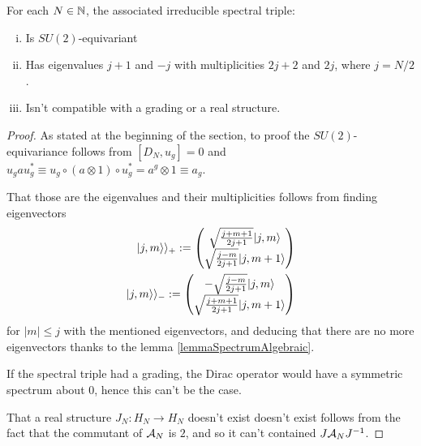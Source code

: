 \begin{proposition}\label{propIrredSpectralTriple}
For each $N \in \mathbb{N}$, the associated irreducible spectral triple:
    \begin{enumerate}[(i)]
        
    \item Is $SU(2)$-equivariant
    
    \item Has eigenvalues $j+1$ and $-j$ with multiplicities $2j+2$ and $2j$, where $j = N/2$.
        
    \item Isn't compatible with a grading or a real structure.
    \end{enumerate}
\end{proposition}

\begin{proof}
As stated at the beginning of the section, to proof the $SU(2)$-equivariance follows from $[D_N, u_g] = 0$ and $u_g  a  u_g^* \equiv u_g \circ (a \otimes 1) \circ u_g^* = a^g \otimes 1 \equiv a_g$.

That those are the eigenvalues and their multiplicities follows from finding eigenvectors 
\begin{align}\label{irreducibleDiracFuzzySpinorBasis}
    |j, m \rangle\rangle_+ := 
    \begin{pmatrix} 
    \sqrt{\frac{j+m+1}{2j+1}} |j, m\rangle \\ 
    \sqrt{\frac{j-m}{2j+1}} |j, m+1 \rangle
    \end{pmatrix} \\
    |j, m\rangle\rangle_- := 
    \begin{pmatrix} 
    -\sqrt{\frac{j-m}{2j+1}} |j, m\rangle \\ 
    \sqrt{\frac{j+m+1}{2j+1}} |j, m+1 \rangle
    \end{pmatrix}
\end{align}
for $|m| \leq j$ with the mentioned eigenvectors, and deducing that there are no more eigenvectors thanks to the lemma \ref{lemmaSpectrumAlgebraic}.

If the spectral triple had a grading, the Dirac operator would have a symmetric spectrum about $0$, hence this can't be the case.

That a real structure $J_N: H_N \to H_N$ doesn't exist doesn't exist follows from the fact that the commutant of $\mathcal A_N$ is $2$, and so it can't contained $J \mathcal A_N J^{-1}$.

\end{proof}


